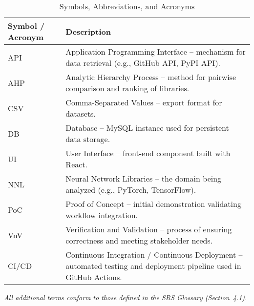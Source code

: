 \documentclass[12pt, titlepage]{article}
\renewcommand{\arraystretch}{1.15}
\begin{document}


\begin{table}[H]
\centering
\caption{Symbols, Abbreviations, and Acronyms}
\setlength{\tabcolsep}{5pt}
\renewcommand{\arraystretch}{1.2}
\footnotesize

\begin{tabularx}{\textwidth}{l X}
\toprule
\textbf{Symbol / Acronym} & \textbf{Description} \\
\midrule
\arrayrulecolor[gray]{0.8}
API & Application Programming Interface – mechanism for data retrieval (e.g., GitHub API, PyPI API). \\
\hline
AHP & Analytic Hierarchy Process – method for pairwise comparison and ranking of libraries. \\
\hline
CSV & Comma-Separated Values – export format for datasets. \\
\hline
DB & Database – MySQL instance used for persistent data storage. \\
\hline
UI & User Interface – front-end component built with React. \\
\hline
NNL & Neural Network Libraries – the domain being analyzed (e.g., PyTorch, TensorFlow). \\
\hline
PoC & Proof of Concept – initial demonstration validating workflow integration. \\
\hline
VnV & Verification and Validation – process of ensuring correctness and meeting stakeholder needs. \\
\hline
CI/CD & Continuous Integration / Continuous Deployment – automated testing and deployment pipeline used in GitHub Actions. \\
\bottomrule
\end{tabularx}
\end{table}

\noindent\textit{All additional terms conform to those defined in the SRS Glossary (Section~4.1).}
\newpage

\end{document}
